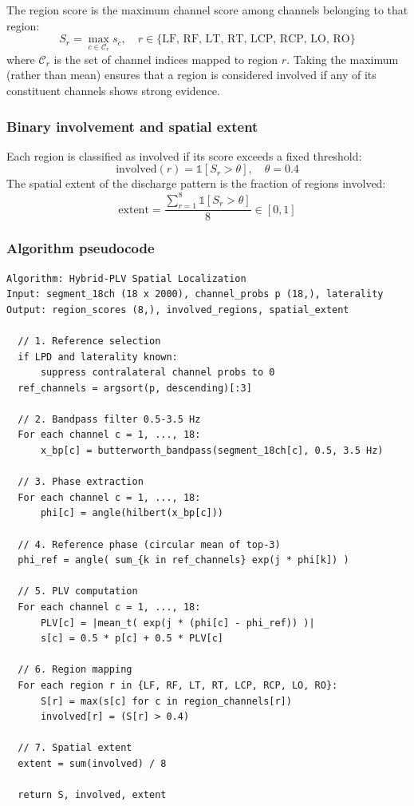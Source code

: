The region score is the maximum channel score among channels belonging to that region:
\[ S_r = \max_{c \in \mathcal{C}_r} s_c, \quad r \in \{\text{LF, RF, LT, RT, LCP, RCP, LO, RO}\} \tag{9} \]
where $\mathcal{C}_r$ is the set of channel indices mapped to region $r$. Taking the maximum (rather than mean) ensures that a region is considered involved if any of its constituent channels shows strong evidence.

\subsubsection{Binary involvement and spatial extent}

Each region is classified as involved if its score exceeds a fixed threshold:
\[ \mathrm{involved}(r) = \mathbb{1}[S_r > \theta], \quad \theta = 0.4 \tag{10} \]
The spatial extent of the discharge pattern is the fraction of regions involved:
\[ \mathrm{extent} = \frac{\sum_{r=1}^{8} \mathbb{1}[S_r > \theta]}{8} \in [0, 1] \tag{11} \]

\subsubsection{Algorithm pseudocode}

\begin{verbatim}
Algorithm: Hybrid-PLV Spatial Localization
Input: segment_18ch (18 x 2000), channel_probs p (18,), laterality
Output: region_scores (8,), involved_regions, spatial_extent

  // 1. Reference selection
  if LPD and laterality known:
      suppress contralateral channel probs to 0
  ref_channels = argsort(p, descending)[:3]

  // 2. Bandpass filter 0.5-3.5 Hz
  For each channel c = 1, ..., 18:
      x_bp[c] = butterworth_bandpass(segment_18ch[c], 0.5, 3.5 Hz)

  // 3. Phase extraction
  For each channel c = 1, ..., 18:
      phi[c] = angle(hilbert(x_bp[c]))

  // 4. Reference phase (circular mean of top-3)
  phi_ref = angle( sum_{k in ref_channels} exp(j * phi[k]) )

  // 5. PLV computation
  For each channel c = 1, ..., 18:
      PLV[c] = |mean_t( exp(j * (phi[c] - phi_ref)) )|
      s[c] = 0.5 * p[c] + 0.5 * PLV[c]

  // 6. Region mapping
  For each region r in {LF, RF, LT, RT, LCP, RCP, LO, RO}:
      S[r] = max(s[c] for c in region_channels[r])
      involved[r] = (S[r] > 0.4)

  // 7. Spatial extent
  extent = sum(involved) / 8

  return S, involved, extent
\end{verbatim}

